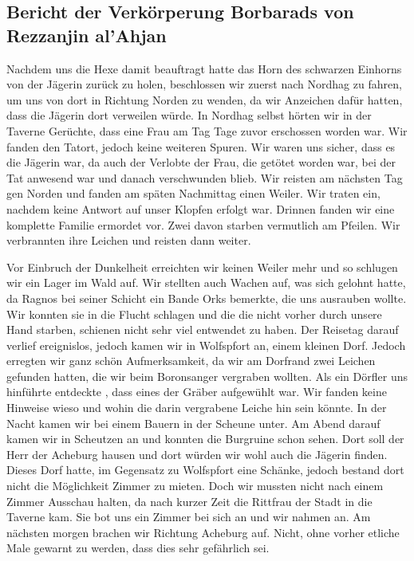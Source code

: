 \subsection{Bericht der Verkörperung Borbarads von Rezzanjin al’Ahjan}
Nachdem uns die Hexe damit beauftragt hatte das Horn des schwarzen Einhorns von der Jägerin zurück zu holen, beschlossen wir zuerst nach Nordhag zu fahren, um uns von dort in Richtung Norden zu wenden, da wir Anzeichen dafür hatten, dass die Jägerin dort verweilen würde. In Nordhag selbst hörten wir in der Taverne Gerüchte, dass eine Frau am Tag Tage zuvor erschossen worden war. Wir fanden den Tatort, jedoch keine weiteren Spuren. Wir waren uns sicher, dass es die Jägerin war, da auch der Verlobte der Frau, die getötet worden war, bei der Tat anwesend war und danach verschwunden blieb. Wir reisten am nächsten Tag gen Norden und fanden am späten Nachmittag einen Weiler. Wir traten ein, nachdem keine Antwort auf unser Klopfen erfolgt war. Drinnen fanden wir eine komplette Familie ermordet vor. Zwei davon starben vermutlich am Pfeilen. Wir verbrannten ihre Leichen und reisten dann weiter. 


Vor Einbruch der Dunkelheit erreichten wir keinen Weiler mehr und so schlugen wir ein Lager im Wald auf. Wir stellten auch Wachen auf, was sich gelohnt hatte, da Ragnos bei seiner Schicht ein Bande Orks bemerkte, die uns ausrauben wollte. Wir konnten sie in die Flucht schlagen und die die nicht vorher durch unsere Hand starben, schienen nicht sehr viel entwendet zu haben. Der Reisetag darauf verlief ereignislos, jedoch kamen wir in Wolfspfort an, einem kleinen Dorf. Jedoch erregten wir ganz schön Aufmerksamkeit, da wir am Dorfrand zwei Leichen gefunden hatten, die wir beim Boronsanger vergraben wollten. Als ein Dörfler uns hinführte entdeckte , dass eines der Gräber aufgewühlt war. Wir fanden keine Hinweise wieso und wohin die darin vergrabene Leiche hin sein könnte. In der Nacht kamen wir bei einem Bauern in der Scheune unter. Am Abend darauf kamen wir in Scheutzen an und konnten die Burgruine schon sehen. Dort soll der Herr der Acheburg hausen und dort würden wir wohl auch die Jägerin finden. Dieses Dorf hatte, im Gegensatz zu Wolfspfort eine Schänke, jedoch bestand dort nicht die Möglichkeit Zimmer zu mieten. Doch wir mussten nicht nach einem Zimmer Ausschau halten, da nach kurzer Zeit die Rittfrau der Stadt in die Taverne kam. Sie bot uns ein Zimmer bei sich an und wir nahmen an.
Am nächsten morgen brachen wir Richtung Acheburg auf. Nicht, ohne vorher etliche Male gewarnt zu werden, dass dies sehr gefährlich sei.

